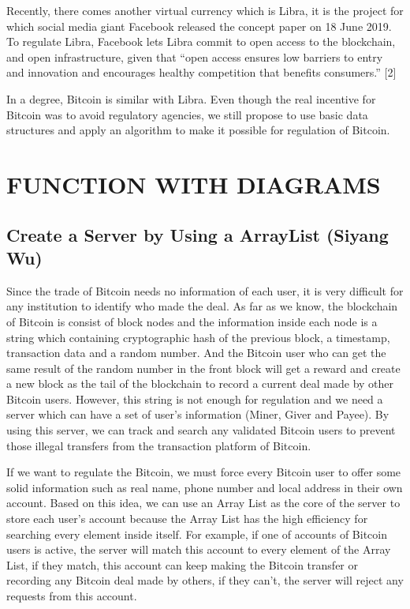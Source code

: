 \documentclass[conference]{IEEEtran}
\begin{document}
Recently, there comes another virtual currency which is Libra, it is the project for which social media giant Facebook released the concept paper on 18 June 2019. To regulate Libra, Facebook lets Libra commit to open access to the blockchain, and open infrastructure, given that “open access ensures low barriers to entry and innovation and encourages healthy competition that benefits consumers.” [2]

In a degree, Bitcoin is similar with Libra. Even though the real incentive for Bitcoin was to avoid regulatory agencies, we still propose to use basic data structures and apply an algorithm to make it possible for regulation of Bitcoin.

\section{FUNCTION WITH DIAGRAMS}

\subsection{Create a Server by Using a ArrayList (Siyang Wu)}

Since the trade of Bitcoin needs no information of each user, it is very difficult for any institution to identify who made the deal. As far as we know, the blockchain of Bitcoin is consist of block nodes and the information inside each node is a string which containing cryptographic hash of the previous block, a timestamp, transaction data and a random number. And the Bitcoin user who can get the same result of the random number in the front block will get a reward and create a new block as the tail of the blockchain to record a current deal made by other Bitcoin users. However, this string is not enough for regulation and we need a server which can have a set of user’s information (Miner, Giver and Payee). By using this server, we can track and search any validated Bitcoin users to prevent those illegal transfers from the transaction platform of Bitcoin.

If we want to regulate the Bitcoin, we must force every Bitcoin user to offer some solid information such as real name, phone number and local address in their own account. Based on this idea, we can use an Array List as the core of the server to store each user’s account because the Array List has the high efficiency for searching every element inside itself. For example, if one of accounts of Bitcoin users is active, the server will match this account to every element of the Array List, if they match, this account can keep making the Bitcoin transfer or recording any Bitcoin deal made by others, if they can’t, the server will reject any requests from this account.
\end{document}
